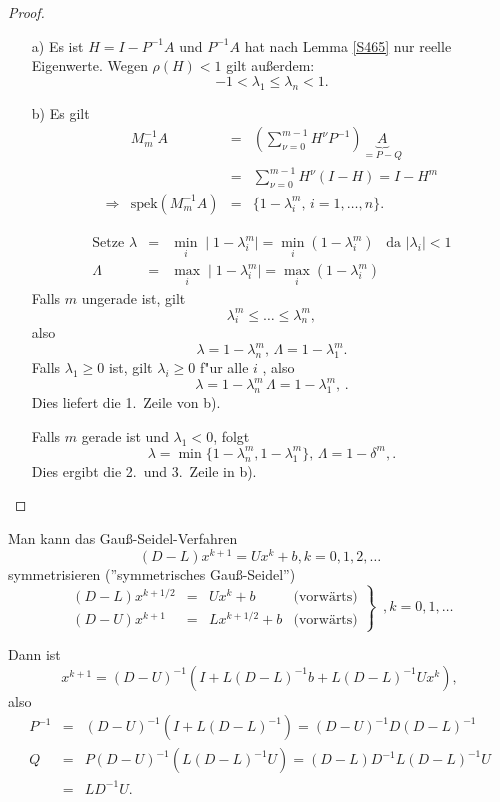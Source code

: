 \begin{proof}
\begin{itemize}
\item[a)] Es ist $H=I-P^{-1}A$ und $P^{-1}A$ hat nach Lemma \ref{S465} nur reelle Eigenwerte. Wegen $ \rho (H) < 1 $ gilt au{\ss}erdem:
\[
 - 1 < \lambda_1 \leq \lambda _n < 1 .
\]

\item[b)] Es gilt
\[\begin{array}{rrcl}
& M_m^{-1} A &=& \left(\sum\limits_{\nu = 0}^{m-1} H^\nu P^{-1} \right) \underbrace{A}_{= P - Q}\\
&&=& \displaystyle{\sum_{\nu=0}^{m-1}} H^\nu (I - H)= I - H^m\\
\Rightarrow &\mbox{spek}{(M_m^{-1} A)} &=& \{ 1 - \lambda_i^m, \, i = 1, \ldots, n \}.
\end{array} \]

\begin{eqnarray*}
\mbox{Setze } \lambda & = & \min_i \mid 1 - \lambda_i^m \mid \displaystyle =
 \min_i (1 - \lambda_i^m) \enspace \mbox{ da } |\lambda_i| < 1 \\
\Lambda & = & \max_i \mid 1 - \lambda_i^m \mid = \max_i (1 - \lambda_i^m)
\end{eqnarray*}
Falls $m$ ungerade ist, gilt
\[
 \lambda_i^m \leq \ldots \leq \lambda_n^m,
\]
also
\[
 \lambda = 1 - \lambda_n^m, \, \Lambda = 1 - \lambda_1^m.
\]
Falls $ \lambda_1 \geq 0$ ist, gilt $\lambda_i \geq 0 $ f"ur alle $ i$ , also
\[
 \lambda = 1 - \lambda_n^m \, \Lambda = 1 - \lambda_1^m, \, .
\]
Dies liefert die 1.~Zeile von b).

Falls $m$  gerade ist und  $\lambda_1 < 0$, folgt
\[
  \lambda  =  \min\{1 - \lambda_n^m, 1 - \lambda_1^m \}, \, \Lambda  =  1 - \delta^m, .
\]
Dies ergibt die 2.~und 3.~Zeile in b).
\end{itemize}
\end{proof}


Man kann das Gau\ss{}-Seidel-Verfahren
\[
(D-L)x^{k+1} = Ux^k + b, k=0,1,2,\ldots
\]
symmetrisieren (''symmetrisches  Gau\ss{}-Seidel'')
\begin{equation*}
\left.
\begin{array}{lcll} (D-L)x^{k+1/2} &=& Ux^k + b &\text{(vorw\"arts)} \\
                     (D-U)x^{k+1} &=& Lx^{k+1/2} + b &\text{(vorw\"arts)}
\end{array} \right\} \enspace, k=0,1,\ldots
\end{equation*}

Dann ist
\[
x^{k+1} = (D-U)^{-1}\left(I+L(D-L)^{-1}b +L(D-L)^{-1}Ux^k\right),
\]
also
\begin{eqnarray*}
P^{-1} &=& (D-U)^{-1}(I+L(D-L)^{-1}) = (D-U)^{-1}D(D-L)^{-1} \\
Q &=& P(D-U)^{-1}\left(L(D-L)^{-1}U\right) = (D-L)D^{-1}L(D-L)^{-1}U \\
   &=& LD^{-1}U.
\end{eqnarray*}

